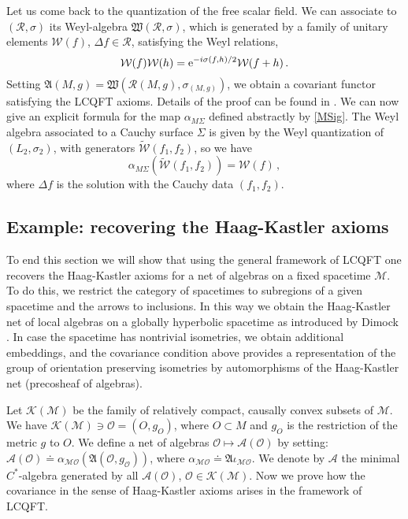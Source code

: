 \documentclass[11pt]{article}
\newcommand{\fA}{\mathfrak{A}}
\newcommand{\Kcal}{\mathcal{K}}
\newcommand{\Mcal}{\mathcal{M}}
\newcommand{\Ocal}{\mathcal{O}}
\newcommand{\Acal}{\mathcal{A}}
\newcommand{\Rcal}{\mathcal{R}}
\newcommand{\Wcal}{\mathcal{W}}
\newcommand{\al}{\alpha}
\newcommand{\De}{\Delta}
\newcommand{\1}{\mathds{1}}                         %
\newcommand{\be}{\begin{equation}}
\newcommand{\ee}{\end{equation}}
\begin{document}
{Let us come back to the quantization of the free scalar field. We can associate to $(\Rcal,\sigma)$ its Weyl-algebra $\mathfrak{W}({\mathcal R},\sigma)$, which is generated
by a family of unitary elements $\Wcal(f)$, $\De f \in {\mathcal R}$,
satisfying the Weyl relations,
\be\label{Weyl}
\Wcal(f)\Wcal(h) = {\rm
  e}^{-i\sigma(f,h)/2} \Wcal(f + h)\,.
  \ee
Setting
 $\fA(M,g) = \mathfrak{W}({\mathcal
  R}(M,g),\sigma_{(M,g)})$,
we obtain a covariant functor satisfying the LCQFT axioms. Details of the proof can be found in \cite{BFV}. We can now give an explicit formula for the map $\al_{M\Sigma}$ defined abstractly by \eqref{MSig}. The Weyl algebra associated to a Cauchy surface $\Sigma$ is given by the Weyl quantization of  $(L_2,\sigma_2)$, with generators $\widetilde{\Wcal}(f_1,f_2)$, so we have
\[
\al_{M\Sigma}(\widetilde{\Wcal}(f_1,f_2))=\Wcal(f)\,,
\]
where $\De f$ is the solution with the Cauchy data $(f_1,f_2)$.
\subsection{Example: recovering the Haag-Kastler axioms}
To end this section we will show that using the general framework of LCQFT one recovers the Haag-Kastler axioms for a net of algebras on a fixed spacetime $\Mcal$.
To do this, we restrict the category of spacetimes to subregions of a given spacetime and the arrows to inclusions. In this way we obtain the Haag-Kastler net of local algebras on a globally hyperbolic spacetime as introduced by Dimock \cite{Dim}. In case the spacetime has nontrivial  isometries,  we obtain additional embeddings, and the covariance condition above provides a representation of the group of orientation preserving isometries by automorphisms of the Haag-Kastler net (precosheaf of algebras). 

Let $\Kcal(\Mcal)$ be the family of relatively compact, causally convex subsets of $\Mcal$.  We have $\mathcal{K}(\mathcal{M})\ni\Ocal=(O,g_{O})$, where $O\subset M$ and $g_{O}$ is the restriction of the metric $g$ to $O$. 
 We define a net of algebras $\Ocal\mapsto \Acal(\Ocal)$ by setting: $\Acal(\Ocal)\doteq \al_{\Mcal\Ocal}(\fA(\Ocal,g_{\Ocal}))$, where $\al_{\Mcal\Ocal}\doteq \mathfrak{A}\iota_{\Mcal\mathcal{O}}$. We denote by $\Acal$ the minimal $C^*$-algebra generated by all $\Acal(\Ocal)$, $\Ocal\in\Kcal(\Mcal)$. Now we prove how the covariance in the sense of Haag-Kastler axioms arises in the framework of LCQFT. 
 
}
\end{document}
